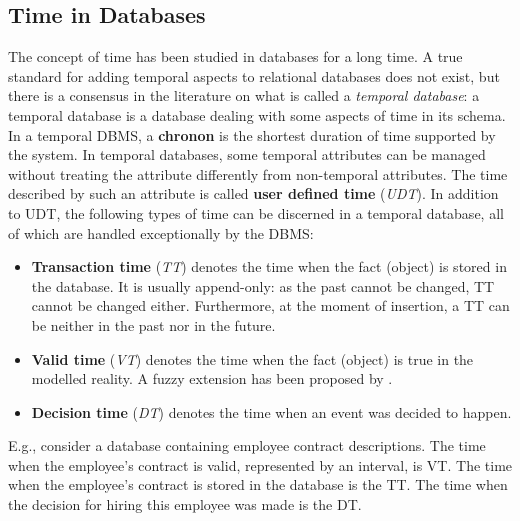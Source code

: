 %
%
\subsection{\label{subsec:time-in-databases}Time in Databases}
The concept of time has been studied in databases for a long time. A true standard for adding temporal aspects to relational databases does not exist, but there is a consensus in the literature \cite{Dyreson1994} on what is called a \emph{temporal database}: a temporal database is a database dealing with some aspects of time in its schema.
In a temporal DBMS, a \textbf{chronon} is the shortest duration of time supported by the system. In temporal databases, some temporal attributes can be managed without treating the attribute differently from non-temporal attributes. The time described by such an attribute is called \textbf{user defined time} (\emph{UDT}). In addition to UDT, the following types of time can be discerned in a temporal database, all of which are handled exceptionally by the DBMS:

\begin{itemize}
	\item
	\textbf{Transaction time} (\emph{TT}) \cite{Rowe1987,Jensen1991} denotes the time when the fact (object) is stored in the database. It is usually append-only: as the past cannot be changed, TT cannot be changed either. Furthermore, at the moment of insertion, a TT can be neither in the past nor in the future.
	\item
	\textbf{Valid time} (\emph{VT}) \cite{Jensen1994,Sarda1990,McKenzie1981} denotes the time when the fact (object) is true in the modelled reality. A fuzzy extension has been proposed by \cite{Garrido2009}. 
	\item
	\textbf{Decision time} (\emph{DT}) \cite{Nascimento1995,Chakravarthy1994,Etzion1992,Ozsoyoglu1995} denotes the time when an event was decided to happen. 
	\end{itemize}
	
	E.g., consider a database containing employee contract descriptions. The time when the employee's contract is valid, represented by an interval, is VT. The time when the employee's contract is stored in the database is the TT. The time when the decision for hiring this employee was made is the DT.

